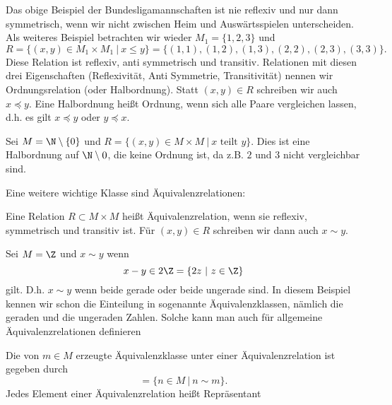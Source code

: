 \documentclass[letterpaper,10pt,english]{jupyterBook}
\begin{document}
Das obige Beispiel der Bundesligamannschaften ist nie reflexiv und nur dann symmetrisch, wenn wir nicht zwischen Heim  und Auswärtsspielen unterscheiden. Als weiteres Beispiel betrachten wir wieder \(M_1 = \{1,2,3\}\) und
\begin{equation*}
 R=\{(x,y) \in M_1 \times M_1~|~x \leq y\} = \{ (1,1),(1,2),(1,3),(2,2),(2,3),(3,3)\}.
\end{equation*}
Diese Relation ist reflexiv, anti symmetrisch und transitiv.
Relationen mit diesen drei Eigenschaften (Reflexivität, Anti Symmetrie, Transitivität) nennen wir Ordnungsrelation (oder Halbordnung). Statt \((x,y) \in R\) schreiben wir auch \(x \preceq y\). Eine Halbordnung heißt Ordnung, wenn sich alle Paare vergleichen lassen, d.h. es gilt \(x \preceq y\) oder \(y \preceq x\).
\label{grundlagen/mengenlogik:example-5}
\begin{example}{}{}



Sei \(M= \N \setminus \{0\}\) und \(R=\{(x,y) \in M \times M~|~x \text{ teilt } y\}\). Dies ist eine Halbordnung auf \(\N \setminus 0\), die keine Ordnung ist, da z.B. \(2\) und \(3\) nicht vergleichbar sind.
\end{example}

Eine weitere wichtige Klasse sind Äquivalenzrelationen:
\label{grundlagen/mengenlogik:definition-6}
\begin{definition}{}{}



Eine Relation \(R \subset M \times M\) heißt Äquivalenzrelation, wenn sie reflexiv, symmetrisch und transitiv ist. Für \((x,y) \in R\) schreiben wir dann auch \(x \sim y\).
\end{definition}
\label{grundlagen/mengenlogik:example-7}
\begin{example}{}{}



Sei \(M= \Z\) und \(x \sim y\) wenn
\begin{equation*}
x-y \in 2 \Z = \{ 2 z ~|~z \in \Z \}
\end{equation*}
gilt. D.h. \(x \sim y\) wenn beide gerade oder beide ungerade sind. In diesem Beispiel kennen wir schon die Einteilung in sogenannte Äquivalenzklassen, nämlich die geraden und die ungeraden Zahlen. Solche kann man auch für allgemeine Äquivalenzrelationen definieren
\end{example}
\label{grundlagen/mengenlogik:definition-8}
\begin{definition}{}{}



Die von \(m \in M\) erzeugte Äquivalenzklasse unter einer Äquivalenzrelation ist gegeben durch
\begin{equation*}
 [m] = \{ n \in M ~|~n \sim m\}.
\end{equation*}
Jedes Element einer Äquivalenzrelation heißt Repräsentant
\end{definition}
\end{document}
